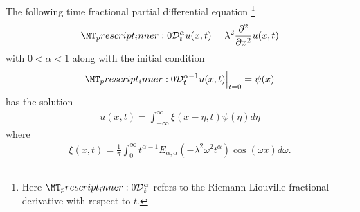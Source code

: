 \begin{mdframed}[innertopmargin=10pt]
\begin{proposition}
    \label{prop:nig_frac}
    The following time fractional partial differential equation \footnote{Here $ \prescript{}{0}{\mathcal{D}}^\alpha_t $ refers to the Riemann-Liouville fractional derivative with respect to $ t $.}
    \begin{align}
        \label{eq:nig_frac}
        \prescript{}{0}{\mathcal{D}}^\alpha_t u(x,t) = \lambda^2 \frac{\partial^2}{\partial x^2}u(x,t)
    \end{align}
    with $ 0 < \alpha < 1 $ along with the initial condition
    \begin{align*}
        \prescript{}{0}{\mathcal{D}}^{\alpha-1}_t u(x,t) \Big|_{t=0} = \psi(x)
    \end{align*}
    has the solution
    \begin{align*}
        u(x,t) = \int_{-\infty}^\infty \xi(x - \eta, t) \psi(\eta) d\eta
    \end{align*}
    where
    \begin{align*}
        \xi(x,t) = \frac{1}{\pi} \int_0^\infty t^{\alpha - 1} E_{\alpha, \alpha}(-\lambda^2\omega^2t^\alpha)\cos(\omega x)d\omega.
    \end{align*}
\end{proposition}
\end{mdframed}
